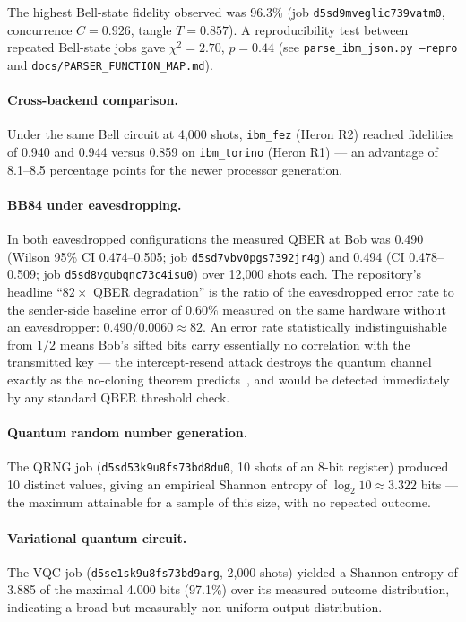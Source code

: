 \documentclass[11pt]{article}
\begin{document}
The highest Bell-state fidelity observed was 96.3\% (job
\texttt{d5sd9mveglic739vatm0}, concurrence $C=0.926$, tangle
$T=0.857$). A reproducibility test between repeated Bell-state jobs
gave $\chi^2=2.70$, $p=0.44$ (see
\texttt{parse\_ibm\_json.py --repro} and
\texttt{docs/PARSER\_FUNCTION\_MAP.md}).

\paragraph{Cross-backend comparison.}
Under the same Bell circuit at 4{,}000 shots, \texttt{ibm\_fez} (Heron R2)
reached fidelities of 0.940 and 0.944 versus 0.859 on \texttt{ibm\_torino}
(Heron R1) --- an advantage of 8.1--8.5 percentage points for the newer
processor generation.

\paragraph{BB84 under eavesdropping.}
In both eavesdropped configurations the measured QBER at Bob was 0.490
(Wilson 95\% CI 0.474--0.505; job \texttt{d5sd7vbv0pgs7392jr4g}) and 0.494
(CI 0.478--0.509; job \texttt{d5sd8vgubqnc73c4isu0}) over 12{,}000 shots
each. The repository's headline ``$82\times$ QBER degradation'' is the ratio
of the eavesdropped error rate to the sender-side baseline error of 0.60\%
measured on the same hardware without an eavesdropper:
$0.490 / 0.0060 \approx 82$. An error rate statistically indistinguishable
from $1/2$ means Bob's sifted bits carry essentially no correlation with the
transmitted key --- the intercept-resend attack destroys the quantum channel
exactly as the no-cloning theorem predicts~\cite{bennett1984quantum}, and
would be detected immediately by any standard QBER threshold check.

\paragraph{Quantum random number generation.}
The QRNG job (\texttt{d5sd53k9u8fs73bd8du0}, 10 shots of an 8-bit register)
produced 10 distinct values, giving an empirical Shannon entropy of
$\log_2 10 \approx 3.322$ bits --- the maximum attainable for a sample of
this size, with no repeated outcome.

\paragraph{Variational quantum circuit.}
The VQC job (\texttt{d5se1sk9u8fs73bd9arg}, 2{,}000 shots) yielded a Shannon
entropy of 3.885 of the maximal 4.000 bits (97.1\%) over its measured
outcome distribution, indicating a broad but measurably non-uniform output
distribution.
\end{document}
